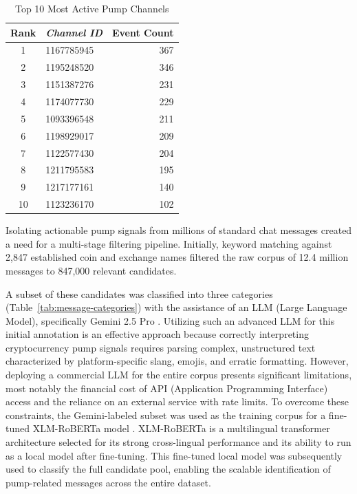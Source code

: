 \begin{table}[H]
\centering
\caption{Top 10 Most Active Pump Channels}
\label{tab:top-channels}
\begin{tabular}{|c|l|r|}
\toprule
\multicolumn{1}{|c|}{\textbf{Rank}} & \multicolumn{1}{c|}{\textbf{\textit{Channel ID}}} & \multicolumn{1}{c|}{\textbf{Event Count}} \\
\midrule
1 & 1167785945 & 367 \\
2 & 1195248520 & 346 \\
3 & 1151387276 & 231 \\
4 & 1174077730 & 229 \\
5 & 1093396548 & 211 \\
6 & 1198929017 & 209 \\
7 & 1122577430 & 204 \\
8 & 1211795583 & 195 \\
9 & 1217177161 & 140 \\
10 & 1123236170 & 102 \\
\bottomrule
\end{tabular}
\datasetsource
\end{table}

Isolating actionable pump signals from millions of standard chat messages created a need for a multi-stage filtering pipeline. Initially, keyword matching against 2,847 established coin and exchange names filtered the raw corpus of 12.4 million messages to 847,000 relevant candidates.

A subset of these candidates was classified into three categories (Table~\ref{tab:message-categories}) with the assistance of an LLM (Large Language Model), specifically Gemini 2.5 Pro \cite{gemini2025pro}. Utilizing such an advanced LLM for this initial annotation is an effective approach because correctly interpreting cryptocurrency pump signals requires parsing complex, unstructured text characterized by platform-specific slang, emojis, and erratic formatting. However, deploying a commercial LLM for the entire corpus presents significant limitations, most notably the financial cost of API (Application Programming Interface) access and the reliance on an external service with rate limits. To overcome these constraints, the Gemini-labeled subset was used as the training corpus for a fine-tuned XLM-RoBERTa model \cite{conneau2020xlmroberta}. XLM-RoBERTa is a multilingual transformer architecture selected for its strong cross-lingual performance and its ability to run as a local model after fine-tuning. This fine-tuned local model was subsequently used to classify the full candidate pool, enabling the scalable identification of pump-related messages across the entire dataset.

